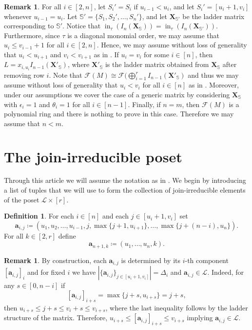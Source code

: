 \documentclass[11pt,a4paper,reqno,dvipsnames]{amsart}
\theoremstyle{plain}
\theoremstyle{definition}
\newtheorem{Assumptions and Discussion}[Theorem]{Assumptions and Discussion}
\newtheorem{Definition}[Theorem]{Definition}
\newtheorem{Remark}[Theorem]{Remark}
\theoremstyle{remark}
\def\ini{\operatorname{in}}
\newcommand\bda{{\bm a}}
\newcommand\bfX{\mathbf{X}}
\newcommand\bfS{\mathbb{S}}
\newcommand\calF{\mathcal{F}}
\newcommand\calL{\mathcal{L}}
\newcommand{\Lr}{\ensuremath{\calL\times[r]}}
\begin{document}
\begin{Remark}\label{shrinkmatrix}
For all $i \in [2,n]$, let $S_i' = S_i$ if $u_{i-1} < u_i$, and let $S_i' = [u_i + 1, v_i]$ whenever $u_{i-1} = u_i$.  
Let $\bfS' = \{S_1, S_2', \ldots, S_n'\}$, and let ${\bfX}_{\bfS'}$ be the ladder matrix corresponding to $\bfS'$.  
Notice that $\ini_{\tau}(I_n(\bfX_{\bfS})) = \ini_{\tau}(I_n(\bfX_{\bfS'}))$.  
Furthermore, since $\tau$ is a diagonal monomial order, we may assume that $u_i \le v_{i-1} + 1$ for all $i \in [2,n]$.  
Hence, 
we may assume without loss of generality that $u_i < u_{i+1}$ and $v_i < v_{i+1}$ as in  . If $u_i=v_i$ for some $i\in [n]$, then $L=x_{i,u_i}I_{n-1}(\bfX'_{\bfS})$, where $\bfX'_{\bfS}$ is the ladder matrix obtained from $\bfX_{\bfS}$ after removing row $i$. Note that $\calF(M) \cong \calF(\bigoplus_{i=1}^r I_{n-1}(\bfX'_{\bfS})$ and thus we may assume without loss of generality that $u_i<v_i$ for all $i\in [n]$ as in . Moreover, under our assumptions we cover the case of a generic matrix by considering $\bfX_{\bfS}$ with $\epsilon_i=1$ and $\theta_i=1$ for all $i\in [n-1]$. Finally, if $n=m$, then $\calF(M)$ is a polynomial ring and there is nothing to prove in this case. Therefore we may assume that $n<m$. 
\end{Remark}



\section{The join-irreducible poset}\label{sec:Poset}


Through this article we will assume the notation as in . We begin by introducing a list of tuples that we will use to form the collection of join-irreducible elements of the poset $\Lr$.



\begin{Definition} \label{def: join irr}
For each $i\in [n]$ and each $j \in [u_i+1, v_i]$ set
    \[\bda_{i,j}\coloneq (u_1, u_2, \ldots, u_{i-1}, j,\max\{j+1, u_{i+1}\}, \ldots, \max\{j+(n-i), u_n\}).\]
For all $k\in[2,r]$ define $$\bda_{n+1,k}\coloneq 
    (u_1,\ldots,u_n,k).$$  
\end{Definition}



\begin{Remark}
By construction,  each $\bda_{i,j}$ is determined by its $i$-th component $[\bda_{i,j}]_{i}$ and for fixed $i$ we have  $|\{\bda_{i,j}\}_{j \in [u_i+1,v_i]}| = \Delta_i$ and $\bda_{i,j} \in \calL$. Indeed, for any $s\in [0,n-i]$ if $$[\bda_{i,j}]_{i+s} = \max\{j+s, u_{i+s}\}=j+s,$$ then  
 $u_{i+s} \le j+ s \le v_i +s \le v_{i+s} $, where the last inequality follows by the ladder structure of the matrix. Therefore, $u_{i+s} \le [\bda_{i,j}]_{i+s} \le v_{i+s}$ implying $\bda_{i,j} \in \calL$.
\end{Remark}
\end{document}
